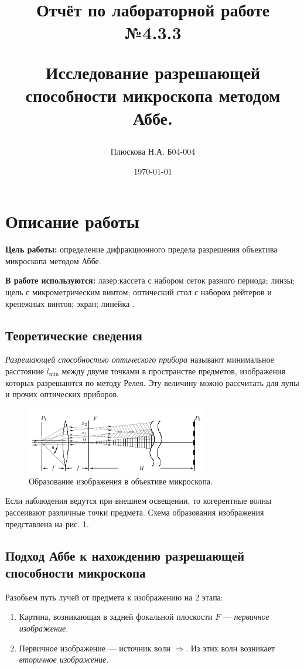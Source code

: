 \documentclass[a4paper,12pt]{report}
\title{Отчёт по лабораторной работе №4.3.3

Исследование разрешающей способности микроскопа методом Аббе.}
\author{Плюскова Н.А. Б04-004 }
\date{\today}
\begin{document}
\maketitle

\section*{\huge{Описание работы}}
\noindent\textbf{Цель работы:} определение дифракционного предела разрешения объектива микроскопа методом Аббе.

\noindent\textbf{В работе используются:} лазер;кассета с набором сеток разного периода; линзы; щель с микрометрическим винтом; оптический стол с набором рейтеров и крепежных винтов; экран; линейка .

\subsection*{Теоретические сведения}
\textit{Разрешающей способностью оптического прибора} называют минимальное расстояние $l_{\min}$ между двумя точками в пространстве предметов, изображения которых разрешаются по методу Релея. Эту величину можно рассчитать для лупы и прочих оптических приборов.
	
	\begin{figure}[h]
		\begin{center}
			\includegraphics[width = 0.7\textwidth]{433-1.png}
			\caption{Образование изображения в объективе микроскопа.}
		\end{center}
	\end{figure}
	
	Если наблюдения ведутся при внешнем освещении, то когерентные волны рассеивают различные точки предмета. Схема образования изображения представлена на рис. 1.
	
	\subsection*{Подход Аббе к нахождению разрешающей способности микроскопа}
	Разобьем путь лучей от предмета к изображению на 2 этапа:
	\begin{enumerate}
		\item Картина, возникающая в задней фокальной плоскости $F$ --- \textit{первичное изображение}. 
		\item Первичное изображение --- источник волн $\Rightarrow$. Из этих волн возникает \textit{вторичное изображение}.
	\end{enumerate}
	
\end{document}
